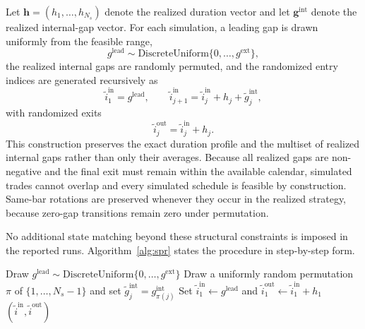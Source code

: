 \documentclass[preprint,12pt]{elsarticle}
\theoremstyle{definition}
\begin{document}
Let \(\mathbf{h}=(h_1,\ldots,h_{N_s})\) denote the realized duration vector and let \(\mathbf{g}^{\mathrm{int}}\) denote the realized internal-gap vector. For each simulation, a leading gap is drawn uniformly from the feasible range,
\begin{equation}
g^{\mathrm{lead}} \sim \mathrm{DiscreteUniform}\{0,\ldots,g^{\mathrm{ext}}\},
\end{equation}
the realized internal gaps are randomly permuted, and the randomized entry indices are generated recursively as
\begin{equation}
\tilde{i}^{\mathrm{in}}_1=g^{\mathrm{lead}}, \qquad
\tilde{i}^{\mathrm{in}}_{j+1}=\tilde{i}^{\mathrm{in}}_j+h_j+\tilde{g}^{\mathrm{int}}_j,
\end{equation}
with randomized exits
\begin{equation}
\tilde{i}^{\mathrm{out}}_j=\tilde{i}^{\mathrm{in}}_j+h_j.
\end{equation}
This construction preserves the exact duration profile and the multiset of realized internal gaps rather than only their averages. Because all realized gaps are non-negative and the final exit must remain within the available calendar, simulated trades cannot overlap and every simulated schedule is feasible by construction. Same-bar rotations are preserved whenever they occur in the realized strategy, because zero-gap transitions remain zero under permutation.

No additional state matching beyond these structural constraints is imposed in the reported runs. Algorithm~\ref{alg:spr} states the procedure in step-by-step form.

\begin{algorithm}[H]
\caption{Structure-preserving randomization of a single trade schedule}
\label{alg:spr}
Draw $g^{\mathrm{lead}}\sim\mathrm{DiscreteUniform}\{0,\ldots,g^{\mathrm{ext}}\}$\;
Draw a uniformly random permutation $\pi$ of $\{1,\ldots,N_s-1\}$ and set $\tilde{g}^{\mathrm{int}}_j=g^{\mathrm{int}}_{\pi(j)}$\;
Set $\tilde{i}^{\mathrm{in}}_1\leftarrow g^{\mathrm{lead}}$ and $\tilde{i}^{\mathrm{out}}_1\leftarrow \tilde{i}^{\mathrm{in}}_1+h_1$\;
\Return $(\tilde{i}^{\mathrm{in}},\tilde{i}^{\mathrm{out}})$
\end{algorithm}
\end{document}
